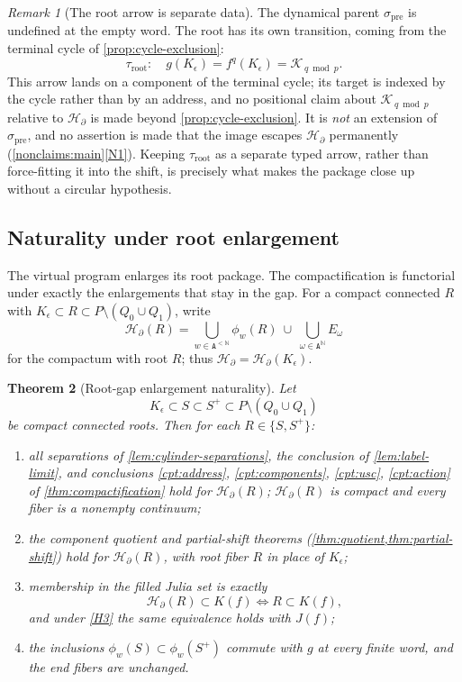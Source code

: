 \documentclass[11pt,reqno]{amsart}
\numberwithin{equation}{section}
\theoremstyle{plain}
\newtheorem{theorem}{Theorem}[section]
\theoremstyle{definition}
\theoremstyle{remark}
\newtheorem{remark}[theorem]{Remark}
\newcommand{\N}{\mathbb N}
\newcommand{\A}{\mathtt A}
\newcommand{\Words}{\A^{<\N}}
\newcommand{\Ends}{\A^{\N}}
\newcommand{\HB}{\mathcal H_\partial}
\newcommand{\spre}{\sigma_{\mathrm{pre}}}
\newcommand{\troot}{\tau_{\mathrm{root}}}
\newcommand{\Kcyc}{\mathcal K}
\newcommand{\rootK}{K_{\epsilon}}
\begin{document}
\begin{remark}[The root arrow is separate data]
\label{rem:root-arrow}
The dynamical parent $\spre$ is undefined at the empty word.  The root
has its own transition, coming from the terminal cycle of
\cref{prop:cycle-exclusion}:
\begin{equation}
 \troot\colon\quad
 g(\rootK)=f^q(\rootK)=\Kcyc_{\,q\bmod p}.
\label{eq:root-arrow}
\end{equation}
This arrow lands on a component of the terminal cycle; its target is
indexed by the cycle rather than by an address, and no positional claim
about $\Kcyc_{\,q\bmod p}$ relative to $\HB$ is made beyond
\cref{prop:cycle-exclusion}.  It is \emph{not} an extension of $\spre$,
and no assertion is made that the image escapes $\HB$ permanently
(\cref{nonclaims:main}\ref{N1}).  Keeping $\troot$ as a separate typed
arrow, rather than force-fitting it into the shift, is precisely what
makes the package close up without a circular hypothesis.
\end{remark}

\subsection{Naturality under root enlargement}

The virtual program enlarges its root package.  The compactification is
functorial under exactly the enlargements that stay in the gap.  For a
compact connected $R$ with
$\rootK\subset R\subset P\setminus(Q_0\cup Q_1)$, write
\[
 \HB(R)
 =
 \bigcup_{w\in\Words}\phi_w(R)
 \ \cup\
 \bigcup_{\omega\in\Ends}E_\omega
\]
for the compactum with root $R$; thus $\HB=\HB(\rootK)$.

\begin{theorem}[Root-gap enlargement naturality]
\label{thm:gap-enlargement}
Let
\begin{equation}
 \rootK\subset S\subset S^+
 \subset P\setminus(Q_0\cup Q_1)
\label{eq:gap-chain}
\end{equation}
be compact connected roots.  Then for each $R\in\{S,S^+\}$:
\begin{enumerate}[label=\textup{(\roman*)}]
 \item all separations of \cref{lem:cylinder-separations}, the
  conclusion of \cref{lem:label-limit}, and conclusions
  \ref{cpt:address}, \ref{cpt:components}, \ref{cpt:usc},
  \ref{cpt:action} of \cref{thm:compactification} hold for $\HB(R)$;
  $\HB(R)$ is compact and every fiber is a nonempty continuum;
 \item the component quotient and partial-shift theorems
  (\cref{thm:quotient,thm:partial-shift}) hold for $\HB(R)$, with root
  fiber $R$ in place of $\rootK$;
 \item membership in the filled Julia set is exactly
  \[
   \HB(R)\subset K(f)
   \iff
   R\subset K(f),
  \]
  and under \ref{H3} the same equivalence holds with $J(f)$;
 \item the inclusions $\phi_w(S)\subset\phi_w(S^+)$ commute with $g$
  at every finite word, and the end fibers are unchanged.
\end{enumerate}
\end{theorem}
\end{document}
